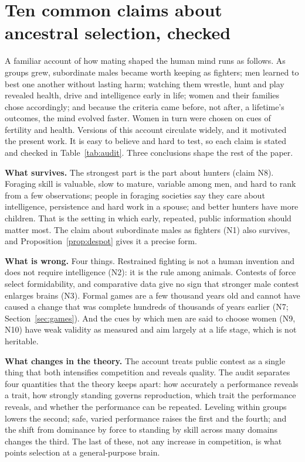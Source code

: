 \section{Ten common claims about ancestral selection, checked}\label{sec:audit}

\noindent A familiar account of how mating shaped the human mind runs as follows. As groups grew, subordinate males became
worth keeping as fighters; men learned to best one another without lasting harm; watching them wrestle, hunt and play revealed
health, drive and intelligence early in life; women and their families chose accordingly; and because the criteria came
before, not after, a lifetime's outcomes, the mind evolved faster. Women in turn were chosen on cues of fertility and health.
Versions of this account circulate widely, and it motivated the present work. It is easy to believe and hard to test, so
each claim is stated and checked in Table~\ref{tab:audit}. Three conclusions shape the rest of the paper.

\textbf{What survives.} The strongest part is the part about hunters (claim N8). Foraging skill is valuable, slow to
mature, variable among men, and hard to rank from a few observations; people in foraging societies say they care about
intelligence, persistence and hard work in a spouse; and better hunters have more children. That is the setting in which
early, repeated, public information should matter most. The claim about subordinate males as fighters (N1) also survives, and
Proposition~\ref{prop:despot} gives it a precise form.

\textbf{What is wrong.} Four things. Restrained fighting is not a human invention and does not require intelligence
(N2): it is the rule among animals. Contests of force select formidability, and comparative data give no sign that stronger
male contest enlarges brains (N3). Formal games are a few thousand years old and cannot have caused a change that was
complete hundreds of thousands of years earlier (N7; Section~\ref{sec:games}). And the cues by which men are said to choose
women (N9, N10) have weak validity as measured and aim largely at a life stage, which is not heritable.

\textbf{What changes in the theory.} The account treats public contest as a single thing that both intensifies
competition and reveals quality. The audit separates four quantities that the theory keeps apart: how accurately a
performance reveals a trait, how strongly standing governs reproduction, which trait the performance reveals, and whether the
performance can be repeated. Leveling within groups lowers the second; safe, varied performance raises the first and the
fourth; and the shift from dominance by force to standing by skill across many domains changes the third. The last of these,
not any increase in competition, is what points selection at a general-purpose brain.


